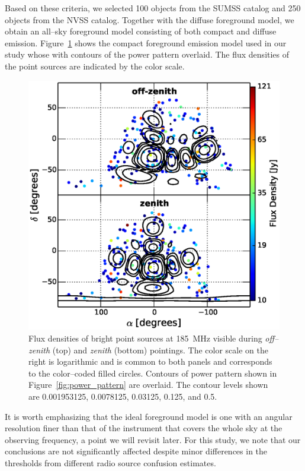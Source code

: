 \documentclass[preprint2,iop,numberedappendix]{emulateapj}
\begin{document}
Based on these criteria, we selected 100 objects from the SUMSS catalog and 250 objects from the NVSS catalog. Together with the diffuse foreground model, we obtain an all--sky foreground model consisting of both compact and diffuse emission. Figure~\ref{fig:CSM} shows the compact foreground emission model used in our study whose with contours of the power pattern overlaid. The flux densities of the point sources are indicated by the color scale. 

\begin{figure}[htb]
\centering
\includegraphics[width=\linewidth]{fig6.eps}
\caption{Flux densities of bright point sources at 185~MHz visible during {\it off--zenith} (top) and {\it zenith} (bottom) pointings. The color scale on the right is logarithmic and is common to both panels and corresponds to the color--coded filled circles. Contours of power pattern shown in Figure~\ref{fig:power_pattern} are overlaid. The contour levels shown are 0.001953125, 0.0078125, 0.03125, 0.125, and 0.5. \label{fig:CSM}}
\end{figure}

It is worth emphasizing that the ideal foreground model is one with an angular resolution finer than that of the instrument that covers the whole sky at the observing frequency, a point we will revisit later. For this study, we note that our conclusions are not significantly affected despite minor differences in the thresholds from different radio source confusion estimates.
\end{document}
